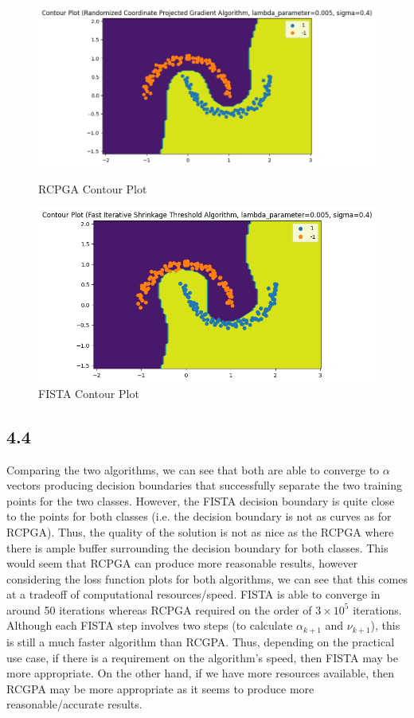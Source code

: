 \documentclass[12pt]{article}
\begin{document}
\begin{figure}[h]
\centering
\begin{minipage}{.5\textwidth}
  \centering
\includegraphics[scale=0.35]{outputs/part_4/rcpga-contour}
\caption{RCPGA Contour Plot}
\label{fig:}
\end{minipage}%
\begin{minipage}{.5\textwidth}
  \centering
\includegraphics[scale=0.35]{outputs/part_4/fista-contour}
\caption{FISTA Contour Plot}
\label{fig:}
\end{minipage}
\end{figure}

\subsection*{4.4}
Comparing the two algorithms, we can see that both are able to converge to $\alpha$ vectors producing decision boundaries that successfully separate the two training points for the two classes. However, the FISTA decision boundary is quite close to the points for both classes (i.e. the decision boundary is not as curves as for RCPGA). Thus, the quality of the solution is not as nice as the RCPGA where there is ample buffer surrounding the decision boundary for both classes. This would seem that RCPGA can produce more reasonable results, however considering the loss function plots for both algorithms, we can see that this comes at a tradeoff of computational resources/speed. FISTA is able to converge in around 50 iterations whereas RCPGA required on the order of $3\times 10^{5}$ iterations. Although each FISTA step involves two steps (to calculate $\alpha_{k+1}$ and $\nu_{k+1}$), this is still a much faster algorithm than RCGPA. Thus, depending on the practical use case, if there is a requirement on the algorithm's speed, then FISTA may be more appropriate. On the other hand, if we have more resources available, then RCGPA may be more appropriate as it seems to produce more reasonable/accurate results.
\end{document}
